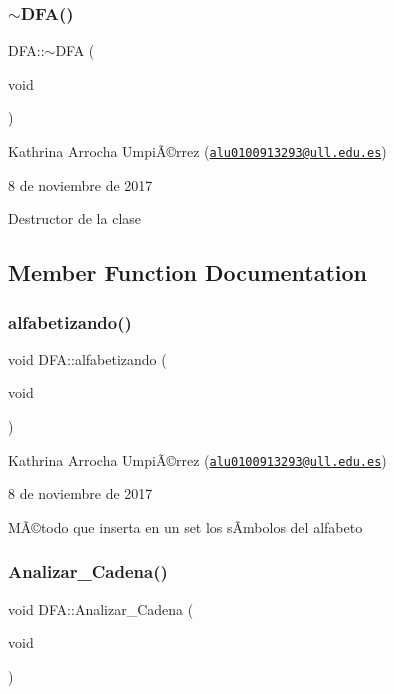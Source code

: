 \subsubsection{\texorpdfstring{$\sim$\+D\+F\+A()}{~DFA()}}
{\footnotesize\ttfamily D\+F\+A\+::$\sim$\+D\+FA (\begin{DoxyParamCaption}\item[{void}]{ }\end{DoxyParamCaption})}

Kathrina Arrocha UmpiÃ©rrez (\href{mailto:alu0100913293@ull.edu.es}{\tt alu0100913293@ull.\+edu.\+es})

8 de noviembre de 2017

Destructor de la clase 

\subsection{Member Function Documentation}
\mbox{\label{class_d_f_a_a3b9768781e98480f0f9677fadb3eb78e}} 
\subsubsection{\texorpdfstring{alfabetizando()}{alfabetizando()}}
{\footnotesize\ttfamily void D\+F\+A\+::alfabetizando (\begin{DoxyParamCaption}\item[{void}]{ }\end{DoxyParamCaption})}

Kathrina Arrocha UmpiÃ©rrez (\href{mailto:alu0100913293@ull.edu.es}{\tt alu0100913293@ull.\+edu.\+es})

8 de noviembre de 2017

MÃ©todo que inserta en un set los sÃ­mbolos del alfabeto \mbox{\label{class_d_f_a_a056c38fca9a65b60acea799ebe9b743b}} 
\subsubsection{\texorpdfstring{Analizar\+\_\+\+Cadena()}{Analizar\_Cadena()}}
{\footnotesize\ttfamily void D\+F\+A\+::\+Analizar\+\_\+\+Cadena (\begin{DoxyParamCaption}\item[{void}]{ }\end{DoxyParamCaption})}

